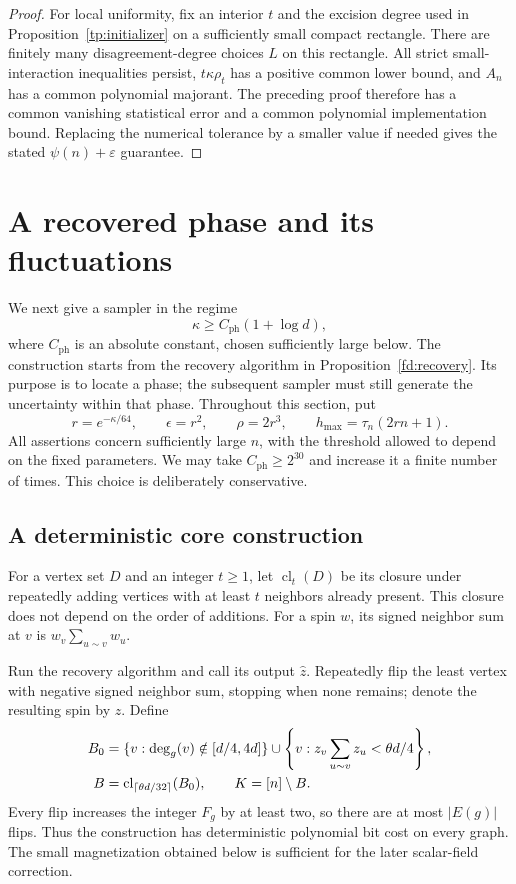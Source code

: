 \documentclass[11pt]{article}
\numberwithin{equation}{section}
\begin{document}
\begin{proof}
For local uniformity, fix an interior $t$ and the excision degree used in Proposition~\ref{tp:initializer} on a sufficiently small compact rectangle. There are finitely many disagreement-degree choices $L$ on this rectangle. All strict small-interaction inequalities persist, $t\kappa\rho_t$ has a positive common lower bound, and $A_n$ has a common polynomial majorant. The preceding proof therefore has a common vanishing statistical error and a common polynomial implementation bound. Replacing the numerical tolerance by a smaller value if needed gives the stated $\psi(n)+\varepsilon$ guarantee.
\end{proof}


\section{A recovered phase and its fluctuations}\label{ph:section_core}

We next give a sampler in the regime
\begin{equation}\label{ph:range}
    \kappa\ge C_{\mathrm{ph}}(1+\log d),
\end{equation}
where $C_{\mathrm{ph}}$ is an absolute constant, chosen sufficiently large below. The construction starts from the recovery algorithm in Proposition~\ref{fd:recovery}. Its purpose is to locate a phase; the subsequent sampler must still generate the uncertainty within that phase. Throughout this section, put
\[
    r=e^{-\kappa/64},\qquad \epsilon=r^2,\qquad
    \rho=2r^3,\qquad h_{\max}=\tau_n(2rn+1).
\]
All assertions concern sufficiently large $n$, with the threshold allowed to depend on the fixed parameters. We may take $C_{\mathrm{ph}}\ge 2^{30}$ and increase it a finite number of times. This choice is deliberately conservative.

\subsection{A deterministic core construction}

For a vertex set $D$ and an integer $t\ge1$, let $\operatorname{cl}_t(D)$ be its closure under repeatedly adding vertices with at least $t$ neighbors already present. This closure does not depend on the order of additions. For a spin $w$, its signed neighbor sum at $v$ is $w_v\sum_{u\sim v}w_u$.

Run the recovery algorithm and call its output $\widehat z$. Repeatedly flip the least vertex with negative signed neighbor sum, stopping when none remains; denote the resulting spin by $z$. Define
\begin{align}\label{ph:construction}
 B_0&=\{v:\deg_g(v)\notin[d/4,4d]\}
       \cup\left\{v:z_v\sum_{u\sim v}z_u<\theta d/4\right\},\notag\\
 B&=\operatorname{cl}_{\lceil\theta d/32\rceil}(B_0),
 \qquad K=[n]\setminus B.
\end{align}
Every flip increases the integer $F_g$ by at least two, so there are at most $|E(g)|$ flips. Thus the construction has deterministic polynomial bit cost on every graph. The small magnetization obtained below is sufficient for the later scalar-field correction.
\end{document}
